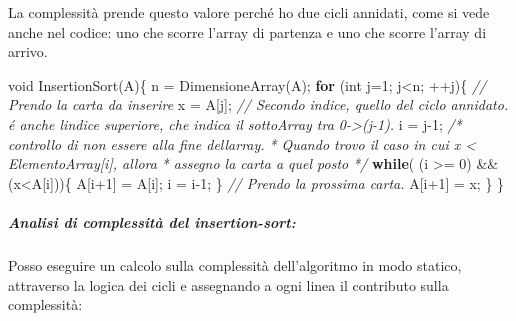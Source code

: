 \documentclass[
]{article}
\newenvironment{Shaded}{}{}
\newcommand{\CommentTok}[1]{\textcolor[rgb]{0.38,0.63,0.69}{\textit{#1}}}
\newcommand{\ControlFlowTok}[1]{\textcolor[rgb]{0.00,0.44,0.13}{\textbf{#1}}}
\newcommand{\DataTypeTok}[1]{\textcolor[rgb]{0.56,0.13,0.00}{#1}}
\newcommand{\DecValTok}[1]{\textcolor[rgb]{0.25,0.63,0.44}{#1}}
\newcommand{\NormalTok}[1]{#1}
\begin{document}
La complessità prende questo valore perché ho due cicli annidati, come
si vede anche nel codice: uno che scorre l'array di partenza e uno che
scorre l'array di arrivo.

\begin{Shaded}
\begin{Highlighting}[]
\DataTypeTok{void}\NormalTok{ InsertionSort(A)\{}
\NormalTok{    n = DimensioneArray(A);}
    \ControlFlowTok{for}\NormalTok{ (}\DataTypeTok{int}\NormalTok{ j=}\DecValTok{1}\NormalTok{; j\textless{}n; ++j)\{}
        \CommentTok{// Prendo la carta da inserire}
\NormalTok{        x = A[j];}
        \CommentTok{// Secondo indice, quello del ciclo annidato. é anche l\textquotesingle{}indice superiore, che indica il sottoArray tra 0{-}\textgreater{}(j{-}1).}
\NormalTok{        i = j{-}}\DecValTok{1}\NormalTok{;}
        \CommentTok{/* controllo di non essere alla fine dell\textquotesingle{}array.}
\CommentTok{         * Quando trovo il caso in cui x \textless{} ElementoArray[i], allora}
\CommentTok{         * assegno la carta a quel posto}
\CommentTok{         */}
        \ControlFlowTok{while}\NormalTok{( (i \textgreater{}= }\DecValTok{0}\NormalTok{) \&\& (x\textless{}A[i]))\{}
\NormalTok{            A[i+}\DecValTok{1}\NormalTok{] = A[i];}
\NormalTok{            i = i{-}}\DecValTok{1}\NormalTok{;}
\NormalTok{        \}}
        \CommentTok{// Prendo la prossima carta.}
\NormalTok{        A[i+}\DecValTok{1}\NormalTok{] = x;}
\NormalTok{    \}}
\NormalTok{\}}
\end{Highlighting}
\end{Shaded}

\hypertarget{header-n1641}{%
\subparagraph{\texorpdfstring{Analisi di complessità del
\emph{insertion-sort}:
}{Analisi di complessità del insertion-sort: }}\label{header-n1641}}

Posso eseguire un calcolo sulla complessità dell'algoritmo in modo
statico, attraverso la logica dei cicli e assegnando a ogni linea il
contributo sulla complessità:
\end{document}
